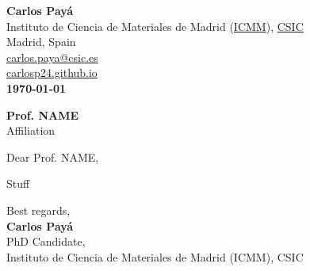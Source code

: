 \documentclass[10pt, a4paper]{article}
\begin{document}

\begin{flushright}
{\Large{\color{my_blue_d}\roboto\bfseries Carlos Payá}}\\[0.2em]
Instituto de Ciencia de Materiales de Madrid (\href{https://www.icmm.csic.es/}{ICMM}), \href{https://www.csic.es/en}{CSIC} \\
Madrid, Spain \\[0.2em]
\href{mailto:carlos.paya@csic.es}{carlos.paya@csic.es} \\
\href{https://carlosp24.github.io}{carlosp24.github.io} \\[1em]
\bf\today
\end{flushright}

\vspace{0.5cm}


\begin{flushleft}
\textbf{Prof. NAME} \\
Affiliation
\end{flushleft}

\vspace{0.5cm}

Dear Prof. NAME,

Stuff
\vspace{0.5cm}


Best regards,\\[1em]
\textbf{Carlos Payá} \\
PhD Candidate, \\
Instituto de Ciencia de Materiales de Madrid (ICMM), CSIC\\
\end{document}
